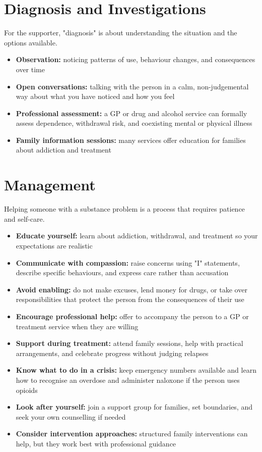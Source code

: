 \section*{Diagnosis and Investigations}
For the supporter, "diagnosis" is about understanding the situation and the options available.
\begin{itemize}
    \item \textbf{Observation:} noticing patterns of use, behaviour changes, and consequences over time
    \item \textbf{Open conversations:} talking with the person in a calm, non-judgemental way about what you have noticed and how you feel
    \item \textbf{Professional assessment:} a GP or drug and alcohol service can formally assess dependence, withdrawal risk, and coexisting mental or physical illness
    \item \textbf{Family information sessions:} many services offer education for families about addiction and treatment
\end{itemize}

\section*{Management}
Helping someone with a substance problem is a process that requires patience and self-care.
\begin{itemize}
    \item \textbf{Educate yourself:} learn about addiction, withdrawal, and treatment so your expectations are realistic
    \item \textbf{Communicate with compassion:} raise concerns using "I" statements, describe specific behaviours, and express care rather than accusation
    \item \textbf{Avoid enabling:} do not make excuses, lend money for drugs, or take over responsibilities that protect the person from the consequences of their use
    \item \textbf{Encourage professional help:} offer to accompany the person to a GP or treatment service when they are willing
    \item \textbf{Support during treatment:} attend family sessions, help with practical arrangements, and celebrate progress without judging relapses
    \item \textbf{Know what to do in a crisis:} keep emergency numbers available and learn how to recognise an overdose and administer naloxone if the person uses opioids
    \item \textbf{Look after yourself:} join a support group for families, set boundaries, and seek your own counselling if needed
    \item \textbf{Consider intervention approaches:} structured family interventions can help, but they work best with professional guidance
\end{itemize}

